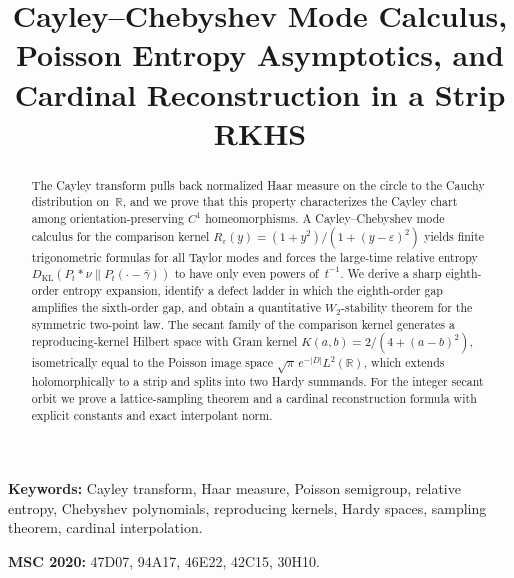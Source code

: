 \documentclass[12pt,a4paper]{article}
\title{Cayley--Chebyshev Mode Calculus, Poisson Entropy Asymptotics, and Cardinal Reconstruction in a Strip RKHS}
\author{}
\date{}
\theoremstyle{plain}
\theoremstyle{definition}
\numberwithin{equation}{section}
\newcommand{\RR}{\mathbb{R}}
\begin{document}
\maketitle

\begin{abstract}
The Cayley transform pulls back normalized Haar measure on the circle
to the Cauchy distribution on~$\RR$, and we prove that this property
characterizes the Cayley chart among orientation-preserving $C^{1}$
homeomorphisms.  A Cayley--Chebyshev mode calculus for the comparison
kernel $R_\varepsilon(y)=(1+y^{2})/(1+(y-\varepsilon)^{2})$ yields
finite trigonometric formulas for all Taylor modes and forces the
large-time relative entropy
$D_{\mathrm{KL}}(P_t*\nu\|P_t(\cdot-\bar\gamma))$ to have only even
powers of~$t^{-1}$.  We derive a sharp eighth-order entropy expansion,
identify a defect ladder in which the eighth-order gap amplifies the
sixth-order gap, and obtain a quantitative $W_2$-stability theorem for
the symmetric two-point law.  The secant family of the comparison kernel
generates a reproducing-kernel Hilbert space with Gram kernel
$K(a,b)=2/(4+(a-b)^{2})$, isometrically equal to the Poisson image
space $\sqrt{\pi}\,e^{-|D|}L^{2}(\RR)$, which extends holomorphically
to a strip and splits into two Hardy summands.  For the integer secant
orbit we prove a lattice-sampling theorem and a cardinal reconstruction
formula with explicit constants and exact interpolant norm.
\end{abstract}

\smallskip
\noindent\textbf{Keywords:}
Cayley transform, Haar measure, Poisson semigroup, relative entropy,
Chebyshev polynomials, reproducing kernels, Hardy spaces, sampling
theorem, cardinal interpolation.

\smallskip
\noindent\textbf{MSC 2020:}
47D07, 94A17, 46E22, 42C15, 30H10.








\appendix




\end{document}
